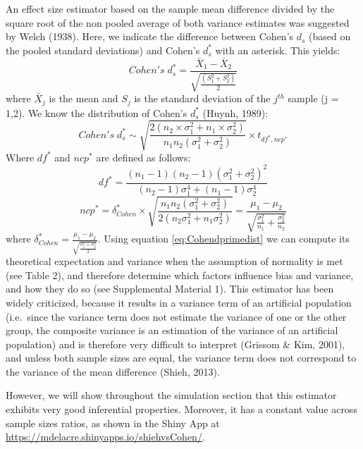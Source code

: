 \documentclass[
  english,
  man,floatsintext]{apa6}
\begin{document}
An effect size estimator based on the sample mean difference divided by the square root of the non pooled average of both variance estimates was suggested by Welch (1938). Here, we indicate the difference between Cohen's \(d_s\) (based on the pooled standard deviations) and Cohen's \(d^*_s\) with an asterisk. This yields:
\begin{equation*} 
Cohen's \; d^*_s = \frac{\bar{X}_{1} - \bar{X}_{2}}{ \sqrt{\frac{\left(S^2_{1}+S^2_{2} \right)}{2}}}
\label{eq:Cohenprimeds}
\end{equation*}
where \(\bar{X}_{j}\) is the mean and \(S_j\) is the standard deviation of the \(j^{th}\) sample (j = 1,2). We know the distribution of Cohen's \(d^*_{s}\) (Huynh, 1989):
\begin{equation} 
Cohen's \; d^*_s \sim  \sqrt{\frac{2(n_2\times\sigma^2_1+n_1\times\sigma^2_2)}{n_1n_2(\sigma^2_1+\sigma^2_2)}} \times t_{df^*,ncp^*}
\label{eq:Cohendprimedist}
\end{equation}
Where \(df^*\) and \(ncp^*\) are defined as follows:
\begin{equation} 
df^* = \frac{(n_1-1)(n_2-1)(\sigma^2_1+\sigma^2_2)^2}{(n_2-1)\sigma^4_1+(n_1-1)\sigma^4_2}
\label{eq:Cohendprimedf}
\end{equation}
\begin{equation*} 
ncp^*=\delta^*_{Cohen} \times \sqrt{\frac{n_1n_2(\sigma^2_1+\sigma^2_2)}{2(n_2\sigma^2_1+n_1\sigma^2_2)}}=\frac{\mu_1-\mu_2}{\sqrt{\frac{\sigma_1^2}{n_1}+\frac{\sigma^2_2}{n_2}}}
\label{eq:Cohendprimevst}
\end{equation*}
where \(\delta^*_{Cohen}=\frac{\mu_1-\mu_2}{\sqrt{\frac{\sigma^2_1+\sigma^2_2}{2}}}\). Using equation \ref{eq:Cohendprimedist} we can compute its theoretical expectation and variance when the assumption of normality is met (see Table 2), and therefore determine which factors influence bias and variance, and how they do so (see Supplemental Material 1). This estimator has been widely criticized, because it results in a variance term of an artificial population (i.e.~since the variance term does not estimate the variance of one or the other group, the composite variance is an estimation of the variance of an artificial population) and is therefore very difficult to interpret (Grissom \& Kim, 2001), and unless both sample sizes are equal, the variance term does not correspond to the variance of the mean difference (Shieh, 2013).

However, we will show throughout the simulation section that this estimator exhibits very good inferential properties. Moreover, it has a constant value across sample sizes ratios, as shown in the Shiny App at \url{https://mdelacre.shinyapps.io/shiehvsCohen/}.
\end{document}
